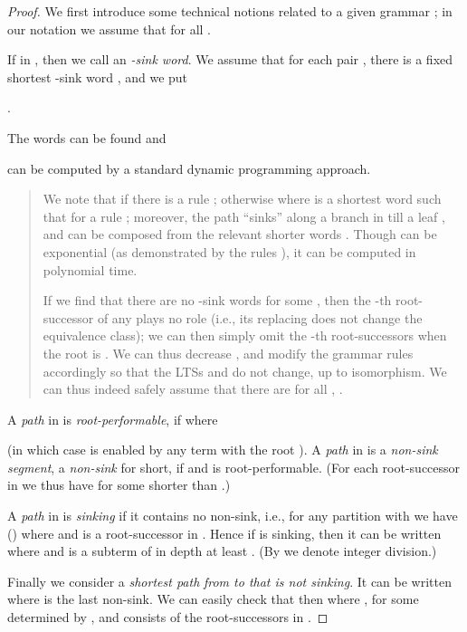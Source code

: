 \documentclass{llncs}
\begin{document}
\begin{proof}
We first introduce some technical notions related
to a given grammar ; 
in our notation we
assume that  for all .

If  in , then we call
 an  \emph{-sink word}.
We assume that for each pair  
,  there is a fixed 
shortest -sink word , and we put 
\begin{center}
.
\end{center}
The words  can be found and 

can be computed by a standard dynamic programming
approach.

\begin{quote}
{\small
We note that   if there is a rule
; otherwise
  where  is a shortest word such that 
  for a rule ; moreover, the path
  ``sinks'' along a branch in  till a leaf , and
 can be composed from the relevant shorter words
. Though  can be exponential (as demonstrated by the rules
), it can be
computed in polynomial time.

If we find that there are no -sink words for some , then 
the -th root-successor of any  plays no role
(i.e., its replacing does not change the equivalence class);  we
can then simply omit the -th root-successors when the root is .
We can thus 
decrease
, and modify the grammar rules accordingly
so that the LTSs   and  
do not change, up
to isomorphism. We can thus indeed safely assume that 
there are  for all ,
.
}
\end{quote}
A \emph{path}  in 
is \emph{root-performable},
if  where 
 
(in which case   is enabled by any term with the root ).
A \emph{path}  in 
is a \emph{non-sink segment}, a \emph{non-sink} for short,
if  and  is
root-performable.
(For each root-successor  in  we thus have
 for some  shorter than .)

A \emph{path}   in 
is \emph{sinking} if it contains no non-sink,
i.e., for any partition  with  we have 
 () where
 and  is a
root-successor in .
Hence if  is sinking, then 
 it can be written  where  and
  is a
subterm of  in depth at least .
(By  we denote integer division.)

Finally we consider a \emph{shortest path}
 \emph{from  to  that is not sinking}.
It can be written 
 where 
 is the last non-sink. 
We can easily check that then  where 
, for some  determined by ,
and  consists of the root-successors in .


\end{proof}
\end{document}
